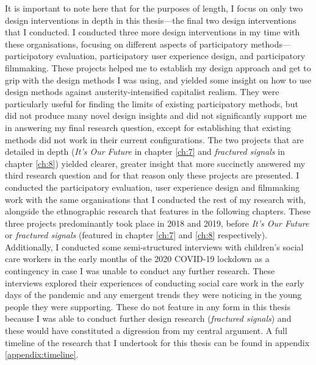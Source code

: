 It is important to note here that for the purposes of length, I focus on only two design interventions in depth in this thesis—the final two design interventions that I conducted. I conducted three more design interventions in my time with these organisations, focusing on different aspects of participatory methods—participatory evaluation, participatory user experience design, and participatory filmmaking. These projects helped me to establish my design approach and get to grip with the design methods I was using, and yielded some insight on how to use design methods against austerity-intensified capitalist realism. They were particularly useful for finding the limits of existing participatory methods, but did not produce many novel design insights and did not significantly support me in answering my final research question, except for establishing that existing methods did not work in their current configurations. The two projects that are detailed in depth (\textit{It's Our Future} in chapter \ref{ch:7} and \textit{fractured signals} in chapter \ref{ch:8}) yielded clearer, greater insight that more succinctly answered my third research question and for that reason only these projects are presented. I conducted the participatory evaluation, user experience design and filmmaking work with the same organisations that I conducted the rest of my research with, alongside the ethnographic research that features in the following chapters. These three projects predominantly took place in 2018 and 2019, before \textit{It's Our Future} or \textit{fractured signals} (featured in chapter \ref{ch:7} and \ref{ch:8} respectively). Additionally, I conducted some semi-structured interviews with children's social care workers in the early months of the 2020 COVID-19 lockdown as a contingency in case I was unable to conduct any further research. These interviews explored their experiences of conducting social care work in the early days of the pandemic and any emergent trends they were noticing in the young people they were supporting. These do not feature in any form in this thesis because I was able to conduct further design research (\textit{fractured signals}) and these would have constituted a digression from my central argument. A full timeline of the research that I undertook for this thesis can be found in appendix \ref{appendix:timeline}.

